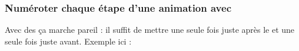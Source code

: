 \addtocounter{framenumber}{-1}
\begin{frame}
\frametitle{Numéroter chaque étape d'une animation avec \lin{\only}}
 	\addtocounter{framenumber}{1}
 	Avec des  \lin{\only} ça marche pareil : il suffit de mettre une seule fois \lin{\addtocounter{framenumber}{1}} juste après le \lin{\begin{frame}} et une seule fois \lin{\addtocounter{framenumber}{-1}} juste avant.
	\medskip
	Exemple ici : 
	\begin{itemize}
	\end{itemize}
\end{frame}

